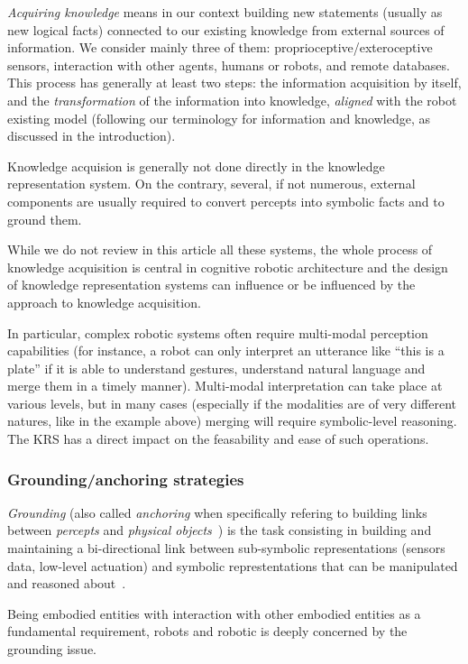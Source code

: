 \documentclass[a4paper, twocolumn]{article}
\begin{document}
\emph{Acquiring knowledge} means in our context building new statements
(usually as new logical facts) connected to our existing knowledge from
external sources of information. We consider mainly three of them:
proprioceptive/exteroceptive sensors, interaction with other agents, humans or
robots, and remote databases. This process has generally at least two steps:
the information acquisition by itself, and the \emph{transformation} of the
information into knowledge, \emph{aligned} with the robot existing model
(following our terminology for information and knowledge, as discussed in the
introduction).

Knowledge acquision is generally not done directly in the knowledge
representation system. On the contrary, several, if not numerous, external
components are usually required to convert percepts into symbolic facts and to
ground them.

While we do not review in this article all these systems, the whole process of
knowledge acquisition is central in cognitive robotic architecture and the
design of knowledge representation systems can influence or be influenced by
the approach to knowledge acquisition.

In particular, complex robotic systems often require multi-modal perception
capabilities (for instance, a robot can only interpret an utterance like ``this
is a plate'' if it is able to understand gestures, understand natural language
and merge them in a timely manner). Multi-modal interpretation can take place
at various levels, but in many cases (especially if the modalities are of very
different natures, like in the example above) merging will require
symbolic-level reasoning. The KRS has a direct impact on the feasability and
ease of such operations.

\subsubsection{Grounding/anchoring strategies}
\label{sect|grounding}

\emph{Grounding} (also called \emph{anchoring} when specifically refering to
building links between \emph{percepts} and \emph{physical
objects}~\cite{Coradeschi2003}) is the task consisting in building and
maintaining a bi-directional link between sub-symbolic representations (sensors
data, low-level actuation) and symbolic represtentations that can be
manipulated and reasoned about~\cite{Harnad1990}.

Being embodied entities with interaction with other embodied entities as a
fundamental requirement, robots and robotic is deeply concerned by the
grounding issue.
\end{document}
